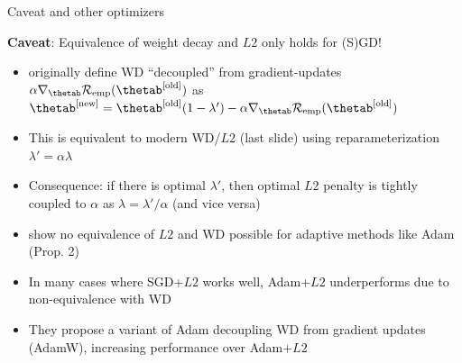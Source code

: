 \documentclass[11pt,compress,t,notes=noshow, xcolor=table]{beamer}
\begin{document}
\begin{vbframe}{Caveat and other optimizers}

\textbf{Caveat}: Equivalence of weight decay and $L2$ only holds for (S)GD!

\begin{itemize}\setlength{\itemsep}{0.5em}
    \item {} originally define WD ``decoupled'' from gradient-updates {\footnotesize $\alpha \nabla_{\thetab} \riske(\thetab^{[\text{old}]})$} as
    {\footnotesize $\thetab^{[\text{new}]} =
    \thetab^{[\text{old}]} (1 - \lambda') - \alpha \nabla_{\thetab} \riske(\thetab^{[\text{old}]})$}
    \item This is equivalent to modern WD/$L2$ (last slide) using reparameterization $\lambda'=\alpha \lambda$
    \item Consequence: if there is optimal $\lambda'$, then optimal $L2$ penalty is tightly coupled to $\alpha$ as $\lambda=\lambda'/ \alpha$ (and vice versa)
    
    \item {} show no equivalence of $L2$ and WD possible for adaptive methods like Adam (Prop. 2)
    \item In many cases where SGD+$L2$ works well, Adam+$L2$ underperforms due to non-equivalence with WD
    \item They propose a variant of Adam decoupling WD from gradient updates (AdamW), increasing performance over Adam+$L2$
\end{itemize}




\end{vbframe}


\endlecture
\end{document}
